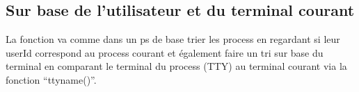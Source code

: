 \subsection{Sur base de l’utilisateur et du terminal courant} 
La fonction va comme dans un ps de base trier les process en regardant si leur userId correspond au process courant et également faire un tri sur base du terminal en comparant le terminal du process (TTY) au terminal courant via la fonction “ttyname()”. 